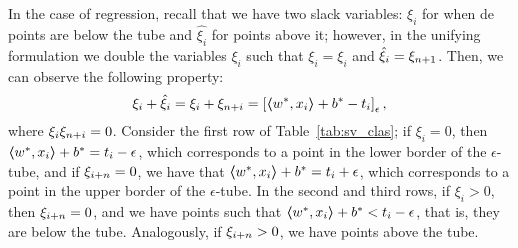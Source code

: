 In the case of regression, recall that we have two slack variables: $\xi_i$ for when de points are below the tube and $\hat{\xi_i}$ for points above it; however, in the unifying formulation we double the variables $\xi_i$ such that $\xi_i = \xi_i$ and $\hat{\xi}_i = \xi_{n + 1}$. Then, we can observe the following property: 
$$ \xi_i + \hat{\xi}_i = \xi_i + {\xi}_{n + i} = \left[\bm{\left\langle} {w}^*, x_i \bm{\right\rangle} + {b}^* - t_i\right]_{\epsilon} ,$$
where $\xi_i {\xi}_{n + i} = 0$. Consider the first row of Table~\ref{tab:sv_clas}; if $\xi_i = 0$, then $\bm{\left\langle} {w}^*, x_i \bm{\right\rangle} + {b}^* = t_i - \epsilon$, which corresponds to a point in the lower border of the $\epsilon$-tube, and if $\xi_{i + n} = 0$, we have that $\bm{\left\langle} {w}^*, x_i \bm{\right\rangle} + {b}^* = t_i + \epsilon$, which corresponds to a point in the upper border of the $\epsilon$-tube.
%
In the second and third rows, if $\xi_i > 0$, then ${\xi}_{i + n} = 0$, and we have points such that $\bm{\left\langle} {w}^*, x_i \bm{\right\rangle} + {b}^* < t_i - \epsilon$, that is, they are below the tube. 
Analogously, if ${\xi}_{i + n} > 0$, we have points above the tube.
%


